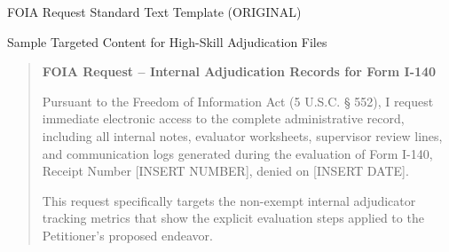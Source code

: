 \documentclass[11pt]{beamer}
\begin{document}
	\begin{frame}{FOIA Request Standard Text Template (ORIGINAL)}
		\scriptsize
		\begin{block}{Sample Targeted Content for High-Skill Adjudication Files}
			\begin{quote}
				\scriptsize
				\textbf{FOIA Request -- Internal Adjudication Records for Form I-140}
				
				Pursuant to the Freedom of Information Act (5 U.S.C. § 552), I request immediate electronic access to the complete administrative record, including all internal notes, evaluator worksheets, supervisor review lines, and communication logs generated during the evaluation of Form I-140, Receipt Number [INSERT NUMBER], denied on [INSERT DATE]. 
				
				This request specifically targets the non-exempt internal adjudicator tracking metrics that show the explicit evaluation steps applied to the Petitioner’s proposed endeavor.
			\end{quote}
		\end{block}
	\end{frame}
	
	
\end{document}

